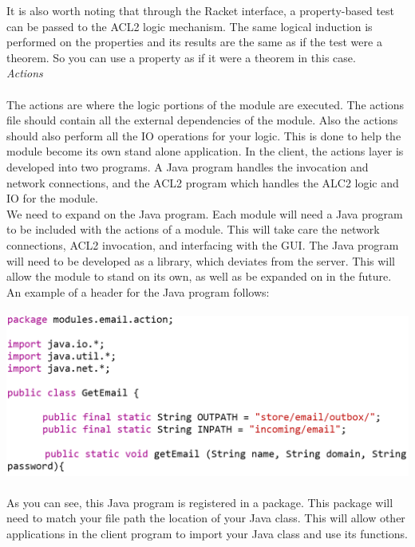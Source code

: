\documentclass[11pt, letterpaper]{report}
\begin{document}
\begin{description}
It is also worth noting that through the Racket interface, a property-based test can be passed to the ACL2 logic mechanism. The same logical induction is performed on the properties and its results are the same as if the test were a theorem. So you can use a property as if it were a theorem in this case.\\

\textit{Actions}\\\\
The actions are where the logic portions of the module are executed. The actions file should contain all the external dependencies of the module. Also the actions should also perform all the IO operations for your logic. This is done to help the module become its own stand alone application. In the client, the actions layer is developed into two programs. A Java program handles the invocation and network connections, and the ACL2 program which handles the ALC2 logic and IO for the module. \\

We need to expand on the Java program. Each module will need a Java program to be included with the actions of a module. This will take care the network connections, ACL2 invocation, and interfacing with the GUI. The Java program will need to be developed as a library, which deviates from the server. This will allow the module to stand on its own, as well as be expanded on in the future.  An example of a header for the Java program follows:\\\\
\includegraphics[scale=0.35]{javapkg}\\\\
As you can see, this Java program is registered in a package. This package will need to match your file path the location of your Java class. This will allow other applications in the client program to import your Java class and use its functions. \\


\end{description}
\end{document}
